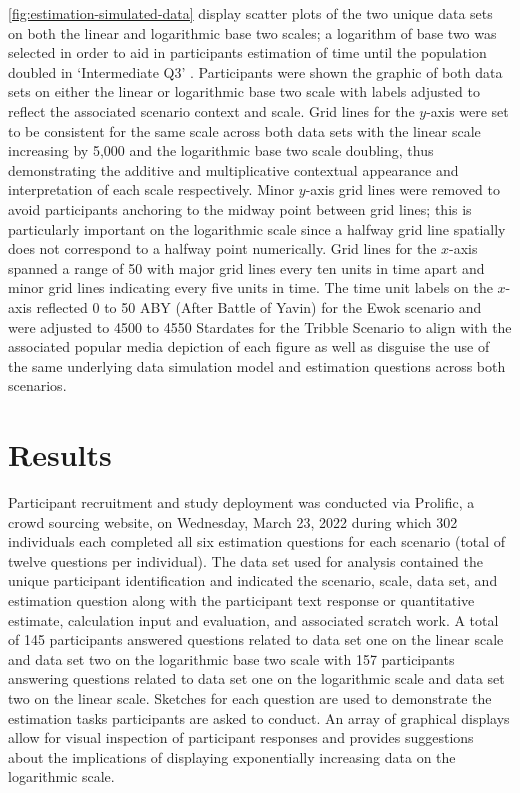 \documentclass[print]{nuthesis}
\begin{document}
\cref{fig:estimation-simulated-data} display scatter plots of the two unique data sets on both the linear and logarithmic base two scales; a logarithm of base two was selected in order to aid in participants estimation of time until the population doubled in `Intermediate Q3' .
Participants were shown the graphic of both data sets on either the linear or logarithmic base two scale with labels adjusted to reflect the associated scenario context and scale.
Grid lines for the \(y\)-axis were set to be consistent for the same scale across both data sets with the linear scale increasing by 5,000 and the logarithmic base two scale doubling, thus demonstrating the additive and multiplicative contextual appearance and interpretation of each scale respectively.
Minor \(y\)-axis grid lines were removed to avoid participants anchoring to the midway point between grid lines; this is particularly important on the logarithmic scale since a halfway grid line spatially does not correspond to a halfway point numerically.
Grid lines for the \(x\)-axis spanned a range of 50 with major grid lines every ten units in time apart and minor grid lines indicating every five units in time.
The time unit labels on the \(x\)-axis reflected 0 to 50 ABY (After Battle of Yavin) for the Ewok scenario and were adjusted to 4500 to 4550 Stardates for the Tribble Scenario to align with the associated popular media depiction of each figure as well as disguise the use of the same underlying data simulation model and estimation questions across both scenarios.

\hypertarget{results-3}{%
\section{Results}\label{results-3}}

Participant recruitment and study deployment was conducted via Prolific, a crowd sourcing website, on Wednesday, March 23, 2022 during which 302 individuals each completed all six estimation questions for each scenario (total of twelve questions per individual).
The data set used for analysis contained the unique participant identification and indicated the scenario, scale, data set, and estimation question along with the participant text response or quantitative estimate, calculation input and evaluation, and associated scratch work.
A total of 145 participants answered questions related to data set one on the linear scale and data set two on the logarithmic base two scale with 157 participants answering questions related to data set one on the logarithmic scale and data set two on the linear scale.
Sketches for each question are used to demonstrate the estimation tasks participants are asked to conduct.
An array of graphical displays allow for visual inspection of participant responses and provides suggestions about the implications of displaying exponentially increasing data on the logarithmic scale.
\end{document}
